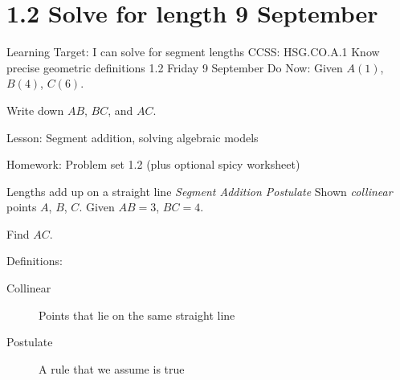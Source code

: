 \section{1.2 Solve for length \hfill 9 September}
\begin{frame}{Learning Target: I can solve for segment lengths}
  {CCSS: HSG.CO.A.1 Know precise geometric definitions  \hfill \alert{1.2 Friday 9 September}}
  Do Now: Given $A(1)$, $B(4)$, $C(6)$. \par \medskip
  Write down $AB$, $BC$, and $AC$.
  \begin{center}
  \end{center} \vspace{1cm}
  Lesson: Segment addition, solving algebraic models \par \medskip
  Homework: Problem set 1.2 (plus optional spicy worksheet)
\end{frame}

\begin{frame}{Lengths add up on a straight line}
  {\emph{Segment Addition Postulate}}
  Shown \emph{collinear} points $A$, $B$, $C$. Given $AB=3$, $BC=4$. \par \medskip
  Find $AC$.
    \begin{center}
    \end{center} \vspace{1cm}
    Definitions:
    \begin{description}
      \item[Collinear] Points that lie on the same straight line
      \item[Postulate] A rule that we assume is true
    \end{description}
\end{frame}

